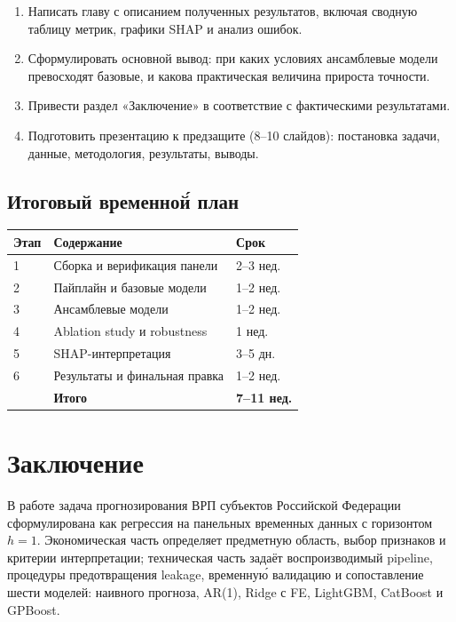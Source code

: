 \documentclass[12pt,a4paper]{article}
\begin{document}
\begin{enumerate}
  \item Написать главу с описанием полученных результатов, включая
        сводную таблицу метрик, графики SHAP и анализ ошибок.
  \item Сформулировать основной вывод: при каких условиях ансамблевые
        модели превосходят базовые, и какова практическая величина
        прироста точности.
  \item Привести раздел «Заключение» в соответствие с фактическими
        результатами.
  \item Подготовить презентацию к предзащите (8--10 слайдов):
        постановка задачи, данные, методология, результаты, выводы.
\end{enumerate}

\subsection*{Итоговый временно\'{й} план}

\begin{center}
\begin{tabular}{lll}
\toprule
Этап & Содержание & Срок \\
\midrule
1 & Сборка и верификация панели & 2--3 нед. \\
2 & Пайплайн и базовые модели  & 1--2 нед. \\
3 & Ансамблевые модели          & 1--2 нед. \\
4 & Ablation study и robustness & 1 нед.    \\
5 & SHAP-интерпретация           & 3--5 дн.  \\
6 & Результаты и финальная правка & 1--2 нед. \\
\midrule
  & \textbf{Итого}              & \textbf{7--11 нед.} \\
\bottomrule
\end{tabular}
\end{center}

\section{Заключение}

В работе задача прогнозирования ВРП субъектов Российской Федерации
сформулирована как регрессия на панельных временных данных с горизонтом
$h=1$. Экономическая часть определяет предметную область, выбор признаков
и критерии интерпретации; техническая часть задаёт воспроизводимый
pipeline, процедуры предотвращения leakage, временну\'{ю} валидацию и
сопоставление шести моделей: наивного прогноза, AR(1), Ridge с FE,
LightGBM, CatBoost и GPBoost.
\end{document}
